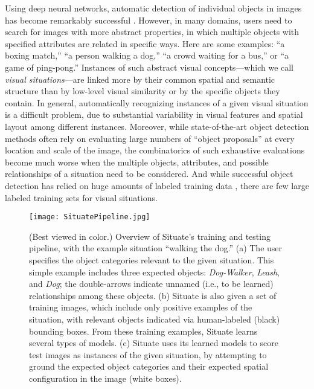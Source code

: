 \documentclass[conference]{IEEEtran}
\begin{document}
Using deep neural networks, automatic detection of individual objects
in images has become remarkably successful \cite{Ren2015}.  However,
in many domains, users need to search for images with more abstract
properties, in which multiple objects with specified attributes are
related in specific ways.  Here are some examples: ``a boxing match,''
``a person walking a dog,'' ``a crowd waiting for a bus,'' or ``a game
of ping-pong.''  Instances of such abstract visual concepts---which we
call {\it visual situations}---are linked more by their common spatial
and semantic structure than by low-level visual similarity or by the
specific objects they contain.  In general, automatically recognizing
instances of a given visual situation is a difficult problem, due to
substantial variability in visual features and spatial layout among
different instances.  Moreover, while state-of-the-art object
detection methods often rely on evaluating large numbers of ``object
proposals'' at every location and scale of the image, the
combinatorics of such exhaustive evaluations become much worse when
the multiple objects, attributes, and possible relationships of a
situation need to be considered.  And while successful object
detection has relied on huge amounts of labeled training data
\cite{Socher2009}, there are few large labeled training sets for
visual situations.

\begin{figure*}[t]
\centering
\texttt{[image: SituatePipeline.jpg]}
\caption{(Best viewed in color.) Overview of Situate's training and
  testing pipeline, with the example situation ``walking the
  dog.''  (a) The user specifies the object categories relevant to the
  given situation.  This simple example includes three expected
  objects: {\it Dog-Walker}, {\it Leash}, and {\it Dog}; the
  double-arrows indicate unnamed (i.e., to be learned) relationships
  among these objects.  (b) Situate is also given a set of training
  images, which include only positive examples of the situation, with
  relevant objects indicated via human-labeled (black) bounding boxes.  From these
  training examples, Situate learns several types of models.  (c)
  Situate uses its learned models to score test images as instances of
  the given situation, by attempting to ground the expected object
  categories and their expected spatial configuration in the image (white boxes).
}
\label{SituatePipeline}
\end{figure*}
\end{document}
